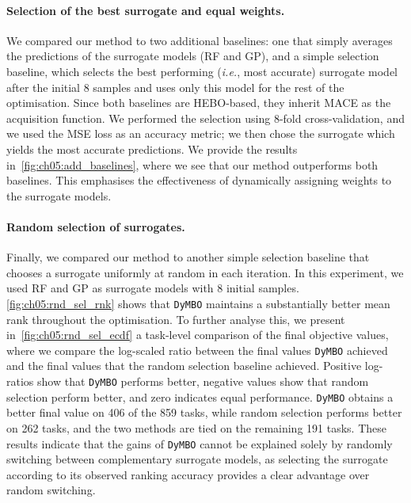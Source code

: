 \paragraph{Selection of the best surrogate and equal weights.}
We compared our method to two additional baselines: one that simply averages the predictions of the surrogate models (RF and GP), and a simple selection baseline, which selects the best performing (\emph{i.e.}, most accurate) surrogate model after the initial 8 samples and uses only this model for the rest of the optimisation. 
Since both baselines are HEBO-based, they inherit MACE as the acquisition function.
We performed the selection using 8-fold cross-validation, and we used the MSE loss as an accuracy metric; we then chose the surrogate which yields the most accurate predictions. 
We provide the results in~\cref{fig:ch05:add_baselines}, where we see that our method outperforms both baselines. This emphasises the effectiveness of dynamically assigning weights to the surrogate models.

\paragraph{Random selection of surrogates.}
Finally, we compared our method to another simple selection baseline that chooses a surrogate uniformly at random in each iteration.
In this experiment, we used RF and GP as surrogate models with 8 initial samples.
\cref{fig:ch05:rnd_sel_rnk} shows that \texttt{DyMBO} maintains a substantially better mean rank throughout the optimisation. To further analyse this, we present in~\cref{fig:ch05:rnd_sel_ecdf} a task-level comparison of the final objective values, where we compare the log-scaled ratio between the final values \texttt{DyMBO} achieved and the final values that the random selection baseline achieved. Positive log-ratios show that \texttt{DyMBO} performs better, negative values show that random selection perform better, and zero indicates equal performance. \texttt{DyMBO} obtains a better final value on 406 of the 859 tasks, while random selection performs better on 262 tasks, and the two methods are tied on the remaining 191 tasks. These results indicate that the gains of \texttt{DyMBO} cannot be explained solely by randomly switching between complementary surrogate models, as selecting the surrogate according to its observed ranking accuracy provides a clear advantage over random switching.



